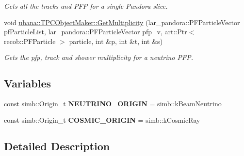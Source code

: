 \begin{DoxyCompactItemize}
\begin{DoxyCompactList}\small\item\em Gets all the tracks and P\-F\-P for a single Pandora slice. \end{DoxyCompactList}\item 
void \hyperlink{group__UBXSec_ga437689da2d66221826a17fece49e581c}{ubana\-::\-T\-P\-C\-Object\-Maker\-::\-Get\-Multiplicity} (lar\-\_\-pandora\-::\-P\-F\-Particle\-Vector pf\-Particle\-List, lar\-\_\-pandora\-::\-P\-F\-Particle\-Vector pfp\-\_\-v, art\-::\-Ptr$<$ recob\-::\-P\-F\-Particle $>$ particle, int \&p, int \&t, int \&s)
\begin{DoxyCompactList}\small\item\em Gets the pfp, track and shower multiplicity for a neutrino P\-F\-P. \end{DoxyCompactList}\end{DoxyCompactItemize}
\subsection*{Variables}
\begin{DoxyCompactItemize}
\item 
\hypertarget{group__UBXSec_ga8c1cb2271faf4557586c53e3f096f35a}{const simb\-::\-Origin\-\_\-t {\bfseries N\-E\-U\-T\-R\-I\-N\-O\-\_\-\-O\-R\-I\-G\-I\-N} = simb\-::k\-Beam\-Neutrino}\label{group__UBXSec_ga8c1cb2271faf4557586c53e3f096f35a}

\item 
\hypertarget{group__UBXSec_gad9e94c0c3656e123f9ff20869847b357}{const simb\-::\-Origin\-\_\-t {\bfseries C\-O\-S\-M\-I\-C\-\_\-\-O\-R\-I\-G\-I\-N} = simb\-::k\-Cosmic\-Ray}\label{group__UBXSec_gad9e94c0c3656e123f9ff20869847b357}

\end{DoxyCompactItemize}


\subsection{Detailed Description}


